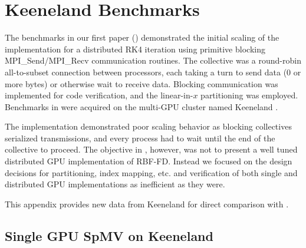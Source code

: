 
\chapter{Keeneland Benchmarks}
\label{app:keeneland_alltoallv_benchmarks}

The benchmarks in our first paper (\cite{BolligFlyerErlebacher2012}) demonstrated the initial scaling of the implementation for a distributed RK4 iteration using primitive blocking MPI\_Send/MPI\_Recv communication routines. The collective was a round-robin all-to-subset connection between processors, each taking a turn to send data (0 or more bytes) or otherwise wait to receive data. Blocking communication was implemented for code verification, and the linear-in-$x$ partitioning was employed. Benchmarks in \cite{BolligFlyerErlebacher2012} were acquired on the multi-GPU cluster named Keeneland \cite{Vetter2011}. 

The implementation demonstrated poor scaling behavior as blocking collectives serialized transmissions, and every process had to wait until the end of the collective to proceed. The objective in \cite{BolligFlyerErlebacher2012}, however, was not to present a well tuned distributed GPU implementation of RBF-FD. Instead we focused on the design decisions for partitioning, index mapping, etc. and verification of both single and distributed GPU implementations as inefficient as they were. 


This appendix provides new data from Keeneland for direct comparison with \cite{BolligFlyerErlebacher2012}.


\section{Single GPU SpMV on Keeneland} 


